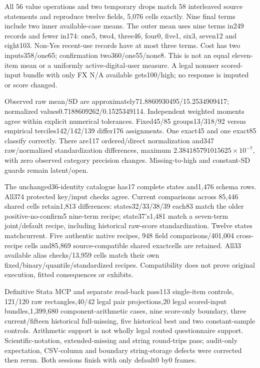 \documentclass[11pt,a4paper]{article}
\begin{document}
All 56 value operations and two temporary drops match 58 interleaved
source statements and reproduce twelve fields, 5,076 cells exactly.
Nine final terms include two inner available-case means. The outer mean
uses nine terms in249 records and fewer in174: one5, two4, three46, four0,
five1, six3, seven12 and eight103. Non-Yes recent-use records have at most
three terms. Cost has two inputs358/one65; confirmation two360/one55/none8.
This is not an equal eleven-item mean or a uniformly active-digital-user
measure. A legal nonuser scored-input bundle with only FX N/A available
gets100/high; no response is imputed or score changed.

Observed raw mean/SD are approximately71.8860930495/15.2534909417;
normalized values0.7188609262/0.1525349114. Independent weighted moments
agree within explicit numerical tolerances. Fixed45/85 groups13/318/92
versus empirical terciles142/142/139 differ176 assignments. One exact45
and one exact85 classify correctly. There are117 ordered/direct
normalization and347 raw/normalized standardization differences, maximum
\(2.384185791015625\times10^{-7}\), with zero observed category precision
changes. Missing-to-high and constant-SD guards remain latent/open.

The unchanged36-identity catalogue has17 complete states and1,476 schema
rows. All374 protected key/input checks agree. Current comparisons across
85,446 shared cells retain1,813 differences: states32/33/38/39 each83
match the older positive-no-confirm5 nine-term recipe; state37's1,481
match a seven-term joint/default recipe, including historical raw-score
standardization. Twelve states matchcurrent. Five authentic native recipes,
948 field comparisons/401,004 cross-recipe cells and85,869 source-compatible
shared exactcells are retained. All33 available alias checks/13,959 cells
match their own fixed/binary/quantile/standardized recipes. Compatibility
does not prove original execution, fitted consequences or exhibits.

Definitive Stata MCP and separate read-back pass113 single-item controls,
121/120 raw rectangles,40/42 legal pair projections,20 legal scored-input
bundles,1,399,680 component-arithmetic cases, nine score-only boundary,
three current/fifteen historical full-missing, five historical best and
two constant-sample controls. Arithmetic support is not wholly legal
routed questionnaire support. Scientific-notation, extended-missing and
string round-trips pass; audit-only expectation, CSV-column and boundary
string-storage defects were corrected then rerun. Both sessions finish
with only default0 by0 frames.
\end{document}
